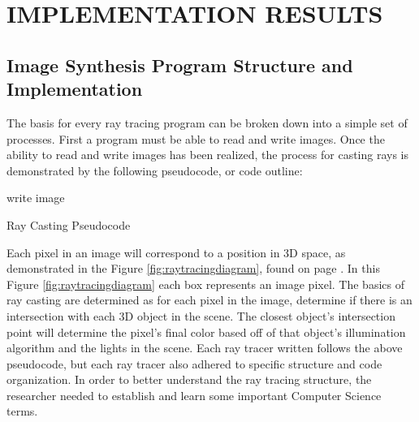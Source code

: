%
%
%


\chapter{\uppercase {Implementation Results}}

\section{Image Synthesis Program Structure and Implementation}

The basis for every ray tracing program can be broken down into a simple set of processes.  First a program must be able to read and write images.  Once the ability to read and write images has been realized, the process for casting rays is demonstrated by the following pseudocode, or code outline:

\begin{algorithm}[H]
\label{alg:RayTracingPseudocode}
write image\;
\caption{Ray Casting Pseudocode}
\end{algorithm}

Each pixel in an image will correspond to a position in 3D space, as demonstrated in the Figure \ref{fig:raytracingdiagram}, found on page \pageref{fig:raytracingdiagram}. In this Figure \ref{fig:raytracingdiagram} each box represents an image pixel.  The basics of ray casting are determined as for each pixel in the image, determine if there is an intersection with each 3D object in the scene.  The closest object's intersection point will determine the pixel's final color based off of that object's illumination algorithm and the lights in the scene.  Each ray tracer written follows the above pseudocode, but each ray tracer also adhered to specific structure and code organization.  In order to better understand the ray tracing structure, the researcher needed to establish and learn some important Computer Science terms.

